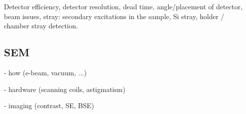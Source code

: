 Detector efficiency, detector resolution, dead time, angle/placement of detector, beam issues, stray: secondary excitations in the sample, Si stray, holder / chamber stray detection.





\subsection{SEM}
\label{sec:theory:sem}


- how (e-beam, vacuum, ...)


- hardware (scanning coils, astigmatism)


- imaging (contrast, SE, BSE)







